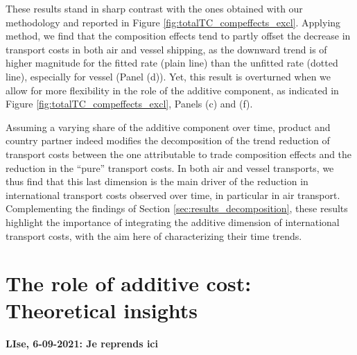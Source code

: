\documentclass[a4paper,11pt]{article}
\begin{document}
These results stand in sharp contrast with the ones obtained with our methodology and reported in Figure \ref{fig:totalTC_compeffects_excl}.
Applying \cite{hummels2007} method, we find that the composition effects tend to partly offset the decrease in transport costs in both air and vessel shipping, as the downward trend is of higher magnitude for the fitted rate (plain line) than the unfitted rate (dotted line), especially for vessel (Panel (d)).
Yet, this result is overturned when we allow for more flexibility in the role of the additive component, as indicated in Figure \ref{fig:totalTC_compeffects_excl}, Panels (c) and (f).\medskip


Assuming a varying share of the additive component over time, product and country partner indeed modifies the decomposition of the trend reduction of transport costs between the one attributable to trade composition effects and the reduction in the ``pure'' transport costs.
In both air and vessel transports, we thus find that this last dimension is the main driver of the reduction in international transport costs observed over time, in particular in air transport.
Complementing the findings of Section \ref{sec:results_decomposition}, these results highlight the importance of integrating the additive dimension of international transport costs, with the aim here of characterizing their time trends.




\section{The role of additive cost: Theoretical insights}\label{sec:theory}

\textbf{LIse, 6-09-2021: Je reprends ici}
\end{document}
